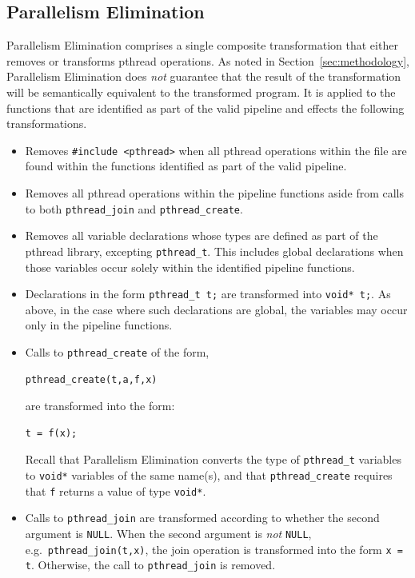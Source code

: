 \subsection{Parallelism Elimination}
\label{sec:refac:elimination}

Parallelism Elimination comprises a single composite transformation that either removes or transforms pthread operations. As noted in Section~\ref{sec:methodology}, Parallelism Elimination
does \emph{not} guarantee that the result of the transformation will be semantically equivalent to the transformed program. It is applied to the functions that are identified as part of the valid pipeline and effects the following transformations.
%
\begin{itemize}
\item Removes \lstinline|#include <pthread>| when all pthread operations within the file are found within the functions identified as part of the valid pipeline.
\item Removes all pthread operations within the pipeline functions aside from calls to both \lstinline|pthread_join| and \lstinline|pthread_create|.
\item Removes all variable declarations whose types are defined as part of the pthread library, excepting \lstinline|pthread_t|. This includes global declarations when those variables occur solely within the identified pipeline functions.
\item Declarations in the form \lstinline|pthread_t t;| are transformed into \lstinline|void* t;|. As above, in the case where such declarations are global, the variables may occur only in the pipeline functions.
\item Calls to \lstinline|pthread_create| of the form,
%
\begin{lstlisting}
pthread_create(t,a,f,x)
\end{lstlisting}
%
are transformed into the form:
%
\begin{lstlisting}
t = f(x);
\end{lstlisting}
%
\noindent
Recall that Parallelism Elimination converts the type of \lstinline|pthread_t| variables to \lstinline|void*| variables of the same name(s), and that \lstinline|pthread_create| requires that \lstinline|f| returns a value of type \lstinline|void*|.
%
\item Calls to \lstinline|pthread_join| are transformed according to whether the second argument is \lstinline|NULL|. When the second argument is \emph{not} \lstinline|NULL|, e.g.\ \lstinline|pthread_join(t,x)|, the join operation is transformed into the form \lstinline|x = t|. Otherwise, the call to \lstinline|pthread_join| is removed.

\end{itemize}
